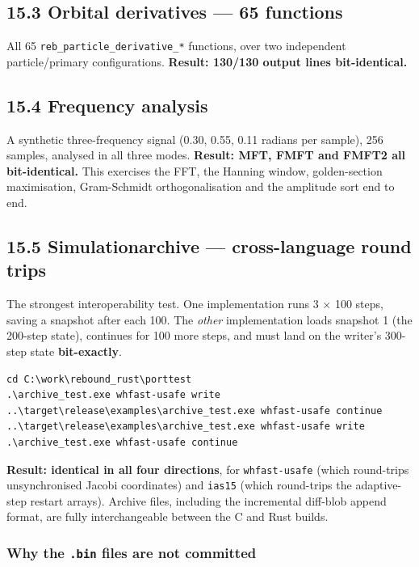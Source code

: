 \documentclass[11pt]{article}
\begin{document}
\subsection{15.3 Orbital derivatives --- 65 functions}

All 65 \texttt{reb\_particle\_derivative\_*} functions, over two independent particle/primary configurations. \textbf{Result: 130/130 output lines bit-identical.}

\subsection{15.4 Frequency analysis}

A synthetic three-frequency signal (0.30, 0.55, 0.11 radians per sample), 256 samples, analysed in all three modes. \textbf{Result: MFT, FMFT and FMFT2 all bit-identical.} This exercises the FFT, the Hanning window, golden-section maximisation, Gram-Schmidt orthogonalisation and the amplitude sort end to end.

\subsection{15.5 Simulationarchive --- cross-language round trips}

The strongest interoperability test. One implementation runs 3 \(\times\) 100 steps, saving a snapshot after each 100. The \emph{other} implementation loads snapshot 1 (the 200-step state), continues for 100 more steps, and must land on the writer's 300-step state \textbf{bit-exactly}.

\begin{lstlisting}
cd C:\work\rebound_rust\porttest
.\archive_test.exe whfast-usafe write
..\target\release\examples\archive_test.exe whfast-usafe continue
..\target\release\examples\archive_test.exe whfast-usafe write
.\archive_test.exe whfast-usafe continue
\end{lstlisting}

\textbf{Result: identical in all four directions}, for \texttt{whfast-usafe} (which round-trips unsynchronised Jacobi coordinates) and \texttt{ias15} (which round-trips the adaptive-step restart arrays). Archive files, including the incremental diff-blob append format, are fully interchangeable between the C and Rust builds.

\subsubsection{Why the \texttt{.bin} files are not committed}
\end{document}
